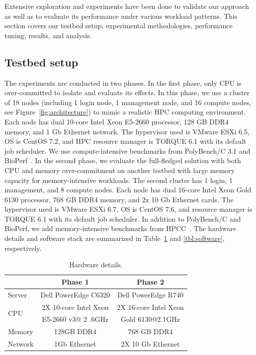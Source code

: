 Extensive exploration and experiments have been done to validate our approach as well as to evaluate 
its performance under various workload patterns. This section covers our testbed setup, experimental 
methodologies, performance tuning, results, and analysis. 

\subsection{Testbed setup}
The experiments are conducted in two phases. In the first phase, only CPU is over-committed 
to isolate and evaluate its effects. 
In this phase, we use a cluster of 18 nodes (including 1 login node, 1 management node, and 16 compute nodes, see Figure~\ref{fig:architecture}) to mimic a realistic HPC computing environment. Each node has dual 10-core Intel Xeon E5-2660 processor, 128 GB DDR4 memory, and 1 Gb Ethernet network. 
The hypervisor used is VMware ESXi 6.5, OS is CentOS 7.2, and HPC resource manager is TORQUE 6.1 with its default job scheduler. We use compute-intensive benchmarks from PolyBench/C 3.1 and BioPerf~\cite{1526013}. 
In the second phase, we evaluate the full-fledged solution with both CPU and memory over-commitment on another testbed with large memory capacity for memory-intensive workloads. The second cluster has 1 login, 1 management, and 8 compute nodes. Each node has dual 16-core Intel Xeon Gold 6130 processor, 768 GB DDR4 memory, and 2x 10 Gb Ethernet cards. 
The hypervisor used is VMware ESXi 6.7, OS is CentOS 7.6, and resource manager is TORQUE 6.1 with its default job scheduler. In addition to PolyBench/C and BioPerf, we add memory-intensive benchmarks from HPCC~\cite{dongarra2004introduction}. The hardware details and software stack are summarized in Table~\ref{tbl:hardware} and \ref{tbl:software}, respectively. 

\begin{table}[!h]\small
  \caption{Hardware details.}
  \centering
    \begin{tabular}{|l|c|c|}
    \hline
     & Phase 1 & Phase 2 \\
    \hline
    Server & Dell PowerEdge C6320 & Dell PowerEdge R740 \\ 
    \hline
    \multirow{2}{*}{CPU} & 2X 10-core Intel Xeon  & 2X 16-core Intel Xeon  \\
                               &  E5-2660 v3@ 2 .6GHz & Gold 6130@2.1GHz \\
    \hline
    Memory & 128GB DDR4 & 768 GB DDR4 \\
    \hline
    Network & 1Gb Ethernet & 2X 10 Gb Ethernet \\
    \hline
    \end{tabular}
  \label{tbl:hardware}
\end{table}

